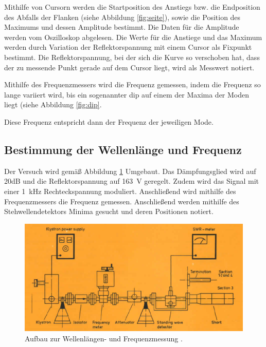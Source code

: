 Mithilfe von Cursorn werden die Startposition des Anstiegs bzw. die Endposition
des Abfalls der Flanken (siehe Abbildung \ref{fig:seite}), sowie die Position des
Maximums und dessen Amplitude bestimmt. Die Daten für die Amplitude werden vom
Oszilloskop abgelesen. Die Werte für die Anstiege und das Maximum werden durch
Variation der Reflektorspannung mit einem Cursor als Fixpunkt bestimmt. Die Reflektorspannung,
bei der sich die Kurve so verschoben hat, dass der zu messende Punkt gerade auf dem
Cursor liegt, wird als Messwert notiert.


Mithilfe des Frequenzmessers
wird die Frequenz gemessen, indem die Frequenz so lange variiert wird, bis ein
sogenannter dip auf einem der Maxima der Moden liegt (siehe Abbildung \ref{fig:dip}.


Diese Frequenz entspricht dann der Frequenz der jeweiligen Mode.

\subsection{Bestimmung der Wellenlänge und Frequenz}
\label{subsec:frequenz}
Der Versuch wird gemäß Abbildung \ref{fig:aufbau_frequenz} Umgebaut. Das Dämpfungsglied
wird auf 20dB und die Reflektorspannung auf \SI{163}{\volt} geregelt. Zudem wird das
Signal mit einer \SI{1}{\kilo\hertz} Rechteckspannung moduliert. Anschließend wird
mithilfe des Frequenzmessers die Frequenz gemessen. Anschließend werden mithilfe des
Stehwellendetektors Minima gesucht und deren Positionen notiert.

\begin{figure}
  \centering
  \includegraphics[width=\textwidth]{data/aufbau_frequenz.png}
  \caption{Aufbau zur Wellenlängen- und Frequenzmessung \cite{Versuchsanleitung_alt}.}
  \label{fig:aufbau_frequenz}
\end{figure}

